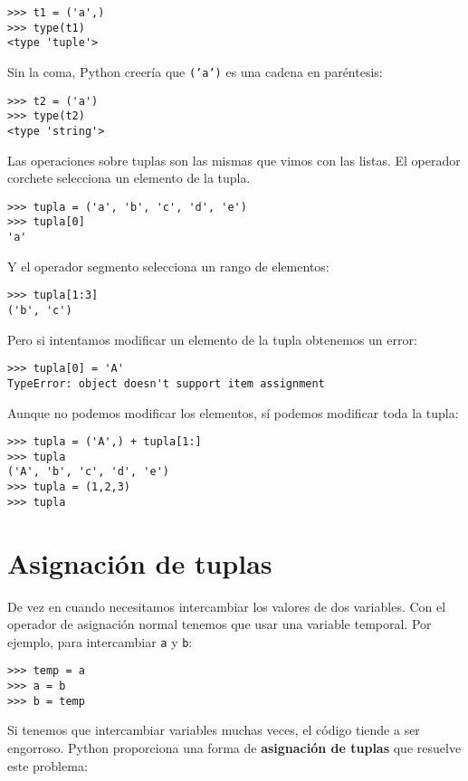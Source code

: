 \beforeverb
\begin{verbatim}
>>> t1 = ('a',)
>>> type(t1)
<type 'tuple'>
\end{verbatim}
\afterverb
%
Sin la coma, Python creería que  \texttt{('a')} es una cadena en
paréntesis:

\beforeverb
\begin{verbatim}
>>> t2 = ('a')
>>> type(t2)
<type 'string'>
\end{verbatim}
\afterverb
%
Las operaciones sobre tuplas son las mismas que vimos con las
listas. El operador corchete selecciona un elemento de la 
tupla.

\beforeverb
\begin{verbatim}
>>> tupla = ('a', 'b', 'c', 'd', 'e')
>>> tupla[0]
'a'
\end{verbatim}
\afterverb
%
Y el operador segmento selecciona un rango de elementos:

\beforeverb
\begin{verbatim}
>>> tupla[1:3]
('b', 'c')
\end{verbatim}
\afterverb
%
Pero si intentamos modificar un elemento de la tupla obtenemos un
error:


\beforeverb
\begin{verbatim}
>>> tupla[0] = 'A'
TypeError: object doesn't support item assignment
\end{verbatim}
\afterverb
%
Aunque no podemos modificar los elementos, sí
podemos modificar toda la tupla:

\beforeverb
\begin{verbatim}
>>> tupla = ('A',) + tupla[1:]
>>> tupla
('A', 'b', 'c', 'd', 'e')
>>> tupla = (1,2,3)
>>> tupla
\end{verbatim}
\afterverb
%

\section{Asignación de tuplas}
\label{tuple assignment}

De vez en cuando necesitamos intercambiar los valores de dos variables.
Con el operador de  asignación normal tenemos que usar una variable
temporal.  Por ejemplo, para intercambiar \texttt{a} y \texttt{b}:

\beforeverb
\begin{verbatim}
>>> temp = a
>>> a = b
>>> b = temp
\end{verbatim}
\afterverb
%
Si tenemos que intercambiar variables muchas veces, el código tiende
a ser engorroso. Python proporciona una forma de {\bf asignación de tuplas} que
resuelve este problema:

